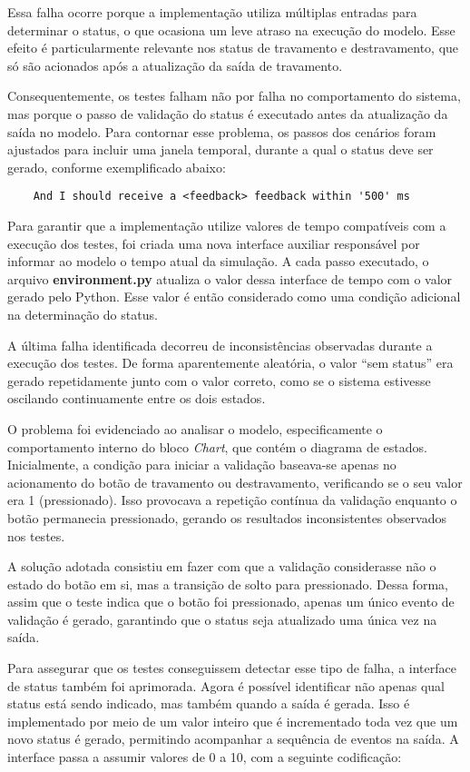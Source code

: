 Essa falha ocorre porque a implementação utiliza múltiplas entradas para determinar o status, o que ocasiona um leve atraso na execução do modelo. Esse efeito é 
particularmente relevante nos status de travamento e destravamento, que só são acionados após a atualização da saída de travamento.

Consequentemente, os testes falham não por falha no comportamento do sistema, mas porque o passo de validação do status é executado antes da atualização da saída no 
modelo. Para contornar esse problema, os passos dos cenários foram ajustados para incluir uma janela temporal, durante a qual o status deve ser gerado, conforme 
exemplificado abaixo:

\begin{verbatim}
	And I should receive a <feedback> feedback within '500' ms
\end{verbatim}


Para garantir que a implementação utilize valores de tempo compatíveis com a execução dos testes, foi criada uma nova interface auxiliar responsável por informar ao 
modelo o tempo atual da simulação. A cada passo executado, o arquivo \textbf{environment.py} atualiza o valor dessa interface de tempo com o valor gerado pelo Python. 
Esse valor é então considerado como uma condição adicional na determinação do status.

A última falha identificada decorreu de inconsistências observadas durante a execução dos testes. De forma aparentemente aleatória, o valor ``sem status'' era gerado 
repetidamente junto com o valor correto, como se o sistema estivesse oscilando continuamente entre os dois estados.

O problema foi evidenciado ao analisar o modelo, especificamente o comportamento interno do bloco \textit{Chart}, que contém o diagrama de estados. Inicialmente, a 
condição para iniciar a validação baseava-se apenas no acionamento do botão de travamento ou destravamento, verificando se o seu valor era 1 (pressionado). Isso 
provocava a repetição contínua da validação enquanto o botão permanecia pressionado, gerando os resultados inconsistentes observados nos testes.

A solução adotada consistiu em fazer com que a validação considerasse não o estado do botão em si, mas a transição de solto para pressionado. Dessa forma, assim que o 
teste indica que o botão foi pressionado, apenas um único evento de validação é gerado, garantindo que o status seja atualizado uma única vez na saída.

Para assegurar que os testes conseguissem detectar esse tipo de falha, a interface de status também foi aprimorada. Agora é possível identificar não apenas qual status 
está sendo indicado, mas também quando a saída é gerada. Isso é implementado por meio de um valor inteiro que é incrementado toda vez que um novo status é gerado, 
permitindo acompanhar a sequência de eventos na saída. A interface passa a assumir valores de 0 a 10, com a seguinte codificação:

